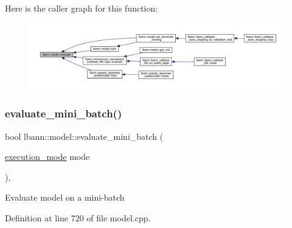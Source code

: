Here is the caller graph for this function\+:\nopagebreak
\begin{figure}[H]
\begin{center}
\leavevmode
\includegraphics[width=350pt]{classlbann_1_1model_a4191097fdbcd1686525e9cd150f958ef_icgraph}
\end{center}
\end{figure}
\mbox{\label{classlbann_1_1model_a9716a956bdc7d20dbc8ce8bf08bbcea7}} 
\subsubsection{\texorpdfstring{evaluate\+\_\+mini\+\_\+batch()}{evaluate\_mini\_batch()}}
{\footnotesize\ttfamily bool lbann\+::model\+::evaluate\+\_\+mini\+\_\+batch (\begin{DoxyParamCaption}\item[{\hyperlink{base_8hpp_a2781a159088df64ed7d47cc91c4dc0a8}{execution\+\_\+mode}}]{mode }\end{DoxyParamCaption})\hspace{0.3cm}{\ttfamily [protected]}, {\ttfamily [virtual]}}

Evaluate model on a mini-\/batch 

Definition at line 720 of file model.\+cpp.


